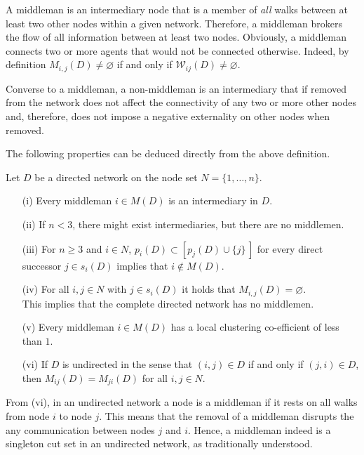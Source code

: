 A middleman is an intermediary node that is a member of \emph{all} walks between at least two other nodes within a given network. Therefore, a middleman brokers the flow of all information between at least two nodes. Obviously, a middleman connects two or more agents that would not be connected otherwise. Indeed, by definition $M_{i,j} (D) \neq \varnothing$ if and only if $\mathcal{W}_{ij} (D) \neq \varnothing$.

Converse to a middleman, a non-middleman is an intermediary that if removed from the network does not affect the connectivity of any two or more other nodes and, therefore, does not impose a negative externality on other nodes when removed.

The following properties can be deduced directly from the above definition.

\begin{proposition}\label{TheoremIntermediary}
Let $D$ be a directed network on the node set $N = \{ 1, \ldots ,n \}$.
\begin{itemize}
\item[(i)] Every middleman $i \in M(D)$ is an intermediary in $D$. 

\item[(ii)] If $n < 3$, there might exist intermediaries, but there are no middlemen.

\item[(iii)] For $n \geqslant 3$ and $i \in N$, $p_{i}(D) \subset \left[ p_{j}(D) \cup \{ j \} \, \right]$ for every direct successor $j \in s_{i}(D)$ implies that $i \notin M(D)$.

\item[(iv)] For all $i,j \in N$ with $j \in s_{i}(D)$ it holds that $M_{i,j}(D) = \varnothing$.
\\
This implies that the complete directed network has no middlemen.

\item[(v)] Every middleman $i \in M(D)$ has a local clustering co-efficient of less than $1$.

\item[(vi)] If $D$ is undirected in the sense that $(i,j) \in D$ if and only if $(j,i) \in D$, then $M_{ij} (D) = M_{ji} (D)$ for all $i,j \in N$.
\end{itemize}
\end{proposition}

From (vi), in an undirected network a node is a middleman if it rests on all walks from node $i$ to node $j$. This means that the removal of a middleman disrupts the any communication between nodes $j$ and $i$. Hence, a middleman indeed is a singleton cut set in an undirected network, as traditionally understood.


